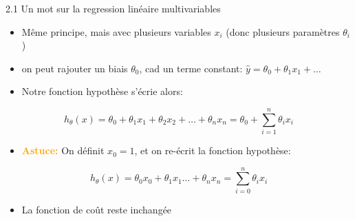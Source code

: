 \begin{frame}{2.1 Un mot sur la regression linéaire multivariables}
  \begin{itemize}
  \item Même principe, mais avec plusieurs variables $x_{i}$ (donc plusieurs paramètres $\theta_{i}$)
  \item on peut rajouter un biais $\theta_{0}$, cad un terme constant: $\hat{y} = \theta_{0} + \theta_{1}x_{1} + \dots$
  \item Notre fonction hypothèse s'écrie alors:
  \end{itemize}
  \begin{equation*}
    h_{\theta}(x) = \theta_{0} + \theta_{1}x_{1} + \theta_{2}x_{2} + \dots + \theta_{n}x_{n} = \theta_{0} + \displaystyle\sum_{i=1}^{n} \theta_{i} x_{i}
  \end{equation*}
  \begin{itemize}
    \item \textbf{\textcolor{orange}{Astuce:}} On définit $x_{0} = 1$, et on re-écrit la fonction hypothèse:
  \end{itemize}
  \begin{equation*}
    h_{\theta}(x) = \theta_{0}x_{0} + \theta_{1}x_{1} \dots + \theta_{n}x_{n} = \displaystyle\sum_{i=0}^{n} \theta_{i} x_{i}
  \end{equation*}

  \begin{itemize}
  \item La fonction de coût reste inchangée
  \end{itemize}
\end{frame}

